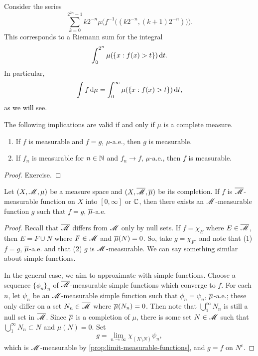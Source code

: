 \documentclass[12pt]{article} %
\begin{document}
\begin{remark}
    Consider the series
    \[\sum_{k=0}^{2^{2n} - 1} k2^{-n} \mu\Big( f^{-1}\Big((k2^{-n}, (k+1)2^{-n})\Big)\Big).\] This corresponds to a Riemann sum for the integral \[\int_0^{2^n} \mu(\{x : f(x) > t\}) \, \mathrm{d} t.\] In particular, \[\int f \, \mathrm{d} \mu = \int_0^\infty \mu(\{x : f(x) > t\}) \, \mathrm{d} t,\] as we will see.
\end{remark} 

\begin{proposition}\label{prop:equal-ae-iff-complete-measure}
    The following implications are valid if and only if $\mu$ is a complete measure. \begin{enumerate}
        \item If $f$ is measurable and $f = g$, $\mu$-a.e., then $g$ is measurable.
        \item If $f_n$ is measurable for $n \in \mathbb{N}$ and $f_n \to f$, $\mu$-a.e., then $f$ is measurable.
    \end{enumerate}
\end{proposition}

\begin{proof}
    Exercise.
\end{proof}

\begin{proposition}\label{prop:equal-ae-function-complete-measure}
    Let $(X, \mathscr{M}, \mu)$ be a measure space and $(X, \overline{\mathscr{M}}, \overline{\mu})$ be its completion. If $f$ is $\overline{\mathscr{M}}$-measurable function on $X$ into $[0,\infty]$ or $ \mathbb{C}$, then there exists an $\mathscr{M}$-measurable function $g$ such that $f = g$, $\overline{\mu}$-a.e.
\end{proposition}

\begin{proof}
    Recall that $\overline{\mathscr{M}}$ differs from $\mathscr{M}$ only by null sets. If $f = \chi_E$ where $E \in \overline{\mathscr{M}}$, then $E = F \cup N$ where $F \in \mathscr{M}$ and $\overline{\mu}(N) = 0$. So, take $g = \chi_F$, and note that (1) $f = g$, $\overline{\mu}$-a.e. and that (2) $g$ is $\mathscr{M}$-measurable. We can say something similar about simple functions. 

    In the general case, we aim to approximate with simple functions. Choose a sequence $\{\phi_n\}_n$ of $\overline{\mathscr{M}}$-measurable simple functions which converge to $f$. For each $n$, let $\psi_n$ be an $\mathscr{M}$-measurable simple function such that $\phi_n = \psi_n$, $\overline{\mu}$-a.e.; these only differ on a set $N_n \in \overline{\mathscr{M}}$ where $\overline{\mu}(N_n) = 0$. Then note that $\bigcup_1^\infty N_n$ is still a null set in $\overline{\mathscr{M}}$. Since $\overline{\mu}$ is a completion of $\mu$, there is some set $N \in \mathscr{M}$ such that $\bigcup_1^\infty N_n \subset N$ and $\mu(N) = 0$. Set \[g = \lim_{n \to \infty} \chi_{(X \setminus N)} \psi_n,\] which is $\mathscr{M}$-measurable by \cref{prop:limit-measurable-functions}, and $g = f$ on $N^c$.
\end{proof}
\end{document}

